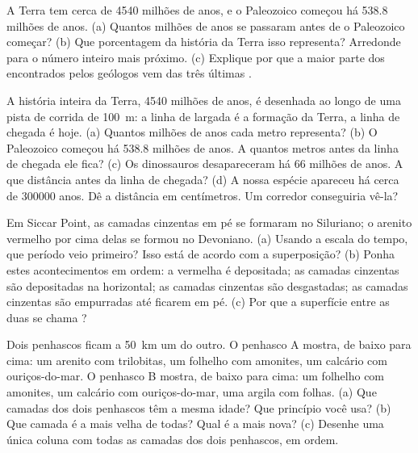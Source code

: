 \begin{exercise}[$\star\star$]\label{exo:g7:geological-time:7}
A Terra tem cerca de \num{4540} milhões de anos, e o Paleozoico começou
há \num{538.8} milhões de anos. (a) Quantos milhões de anos se passaram
antes de o Paleozoico começar? (b) Que porcentagem da história da Terra
isso representa? Arredonde para o número inteiro mais próximo.
(c) Explique por que a maior parte dos  encontrados pelos
geólogos vem das três últimas .
\end{exercise}

\begin{exercise}[$\star\star$]\label{exo:g7:geological-time:8}
A história inteira da Terra, \num{4540} milhões de anos, é desenhada ao
longo de uma pista de corrida de \qty{100}{m}: a linha de largada é a
formação da Terra, a linha de chegada é hoje. (a) Quantos milhões de anos
cada metro representa? (b) O Paleozoico começou há \num{538.8} milhões de
anos. A quantos metros antes da linha de chegada ele fica? (c) Os
dinossauros desapareceram há \num{66} milhões de anos. A que distância
antes da linha de chegada? (d) A nossa espécie apareceu há cerca de
\num{300000} anos. Dê a distância em centímetros. Um corredor
conseguiria vê-la?
\end{exercise}

\begin{exercise}[$\star\star$]\label{exo:g7:geological-time:9}
Em Siccar Point, as camadas cinzentas em pé se formaram no Siluriano; o
arenito vermelho por cima delas se formou no Devoniano. (a) Usando a
escala do tempo, que período veio primeiro? Isso está de acordo com a
superposição? (b) Ponha estes acontecimentos em ordem: a  vermelha é
depositada; as camadas cinzentas são depositadas na horizontal; as
camadas cinzentas são desgastadas; as camadas cinzentas são empurradas
até ficarem em pé. (c) Por que a superfície entre as duas  se
chama ?
\end{exercise}

\begin{exercise}[$\star\star$]\label{exo:g7:geological-time:10}
Dois penhascos ficam a \qty{50}{km} um do outro. O penhasco A mostra, de
baixo para cima: um arenito com trilobitas, um folhelho com amonites, um
calcário com ouriços-do-mar. O penhasco B mostra, de baixo para cima: um
folhelho com amonites, um calcário com ouriços-do-mar, uma argila com
folhas. (a) Que camadas dos dois penhascos têm a mesma idade? Que
princípio você usa? (b) Que camada é a mais velha de todas? Qual é a mais
nova? (c) Desenhe uma única coluna com todas as camadas dos dois
penhascos, em ordem.
\end{exercise}

